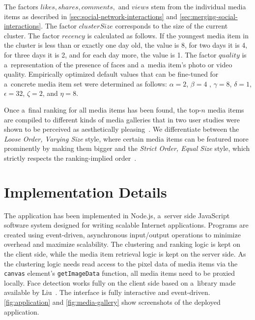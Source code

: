 \documentclass{sig-alternate}
\begin{document}
The factors $ \mathit{likes}, \mathit{shares}, \mathit{comments},$ and $ \mathit{views} $
stem from the individual media items as described in \autoref{sec:social-network-interactions}
and \autoref{sec:merging-social-interactions}.
The factor $ \mathit{clusterSize} $ corresponds to the size of the current cluster. 
The factor $ \mathit{recency} $ is calculated as follows.
If the youngest media item in the cluster is less than or exactly one day old,
the value is 8, for two days it is 4, for three days it is 2,
and for each day more, the value is 1.
The factor $ \mathit{quality} $ is a~representation of the
presence of faces and a~media item’s photo or video quality.
Empirically optimized default values
that can be fine-tuned for a~concrete media item set
were determined as follows:
$ \alpha = 2 $, $ \beta = 4 $ , $ \gamma = 8 $, $ \delta = 1 $,
$ \epsilon = 32 $, $ \zeta = 2 $, and $ \eta = 8 $.

Once a~final ranking for all media items has been found,
the top-$n$ media items are compiled to different kinds of media galleries
that in two user studies were shown to be perceived as
aesthetically pleasing~\cite{steiner2013mediagalleries}.
We differentiate between the \emph{Loose Order, Varying Size} style,
where certain media items can be featured more prominently by making them bigger
and the \emph{Strict Order, Equal Size} style,
which strictly respects the ranking-implied order~\cite{steiner2013mediagalleries}.

\section{Implementation Details}

The application has been implemented in Node.js,
a~server side JavaScript software system
designed for writing scalable Internet applications.
Programs are created using event-driven, asynchronous input/output operations
to minimize overhead and maximize scalability.
The clustering and ranking logic is kept on the client side,
while the media item retrieval logic is kept on the server side.
As the clustering logic needs read access to the pixel data of media items via
the \texttt{canvas} element’s \texttt{getImageData} function,
all media items need to be proxied locally.
Face detection works fully on the client side based on a~library
made available by Liu~\cite{liu2012facedetection}.
The interface is fully interactive and event-driven.
\autoref{fig:application} and \autoref{fig:media-gallery} show screenshots
of the deployed application.
\end{document}
